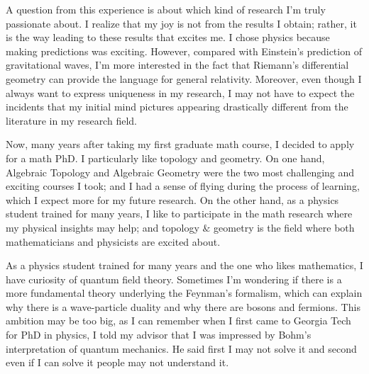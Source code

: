 \documentclass[nottitlepage]{article}
\begin{document}
A question from this experience is about which kind of research I'm truly passionate about. I realize that my joy is not from the results I obtain; rather, it is the way leading to these results that excites me. I chose physics because making predictions was exciting. However, compared with Einstein's prediction of gravitational waves, I'm more interested in the fact that Riemann's differential geometry can provide the language for general relativity. Moreover, even though I always want to express uniqueness in my research, I may not have to expect the incidents that my initial mind pictures appearing drastically different from the literature in my research field.

Now, many years after taking my first graduate math course, I decided to apply for a math PhD. I particularly like topology and geometry. On one hand, Algebraic Topology and Algebraic Geometry were the two most challenging and exciting courses I took; and I had a sense of flying during the process of learning, which I expect more for my future research. On the other hand, as a physics student trained for many years, I like to participate in the math research where my physical insights may help; and topology $\&$ geometry is the field where both mathematicians and physicists are excited about.

As a physics student trained for many years and the one who likes mathematics, I have curiosity of quantum field theory. Sometimes I'm wondering if there is a more fundamental theory underlying the Feynman's formalism, which can explain why there is a wave-particle duality and why there are bosons and fermions. This ambition may be too big, as I can remember when I first came to Georgia Tech for PhD in physics, I told my advisor that I was impressed by Bohm's interpretation of quantum mechanics. He said first I may not solve it and second even if I can solve it people may not understand it. 
\end{document}
